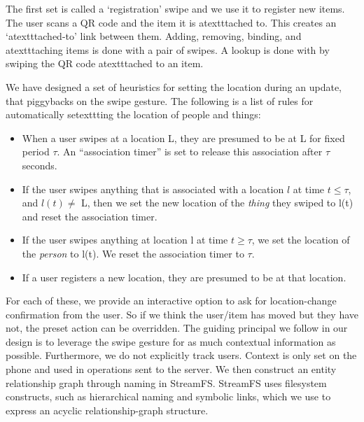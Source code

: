 The first set is called a `registration' swipe and we use it to register new items.  The user scans a QR code and the item it is atextttached
to.  This creates an `atextttached-to' link between them.  Adding, removing, binding, and atextttaching items is done with a pair of swipes.
A lookup is done with by swiping the QR code atextttached to an item.

We have designed a set of heuristics for setting the location during an update, that piggybacks on the swipe gesture.
The following is a list of rules for automatically setexttting the location of people and things:

\begin{itemize}
\item When a user swipes at a location L, they are presumed to be at L for fixed period $\tau$.  An ``association timer'' is set to 
        release this association after $\tau$ seconds.
\item If the user swipes anything that is associated with a location $l$ at time $t \le \tau$, and $l(t)\ne$ L, 
        then we set the new location of the \emph{thing} they swiped to l(t) and reset the association timer.
\item If the user swipes anything at location l at time $t \ge \tau$, we set the location of the \emph{person} to l(t).
        We reset the association timer to $\tau$.
\item If a user registers a new location, they are presumed to be at that location.
\end{itemize}
\vspace{0.08in}


For each of these, we provide an interactive option to ask for location-change confirmation from the user.  So if we think the
user/item has moved but they have not, the preset action can be overridden.  The guiding principal we follow in our design
is to leverage the swipe gesture for as much contextual information as possible.  Furthermore, we do not explicitly track users.
Context is only set on the phone and used in operations sent to the server.  
We then construct an entity relationship graph through 
naming in StreamFS.  StreamFS uses filesystem constructs, such as hierarchical naming and symbolic
links, which we use to express an acyclic relationship-graph structure.

